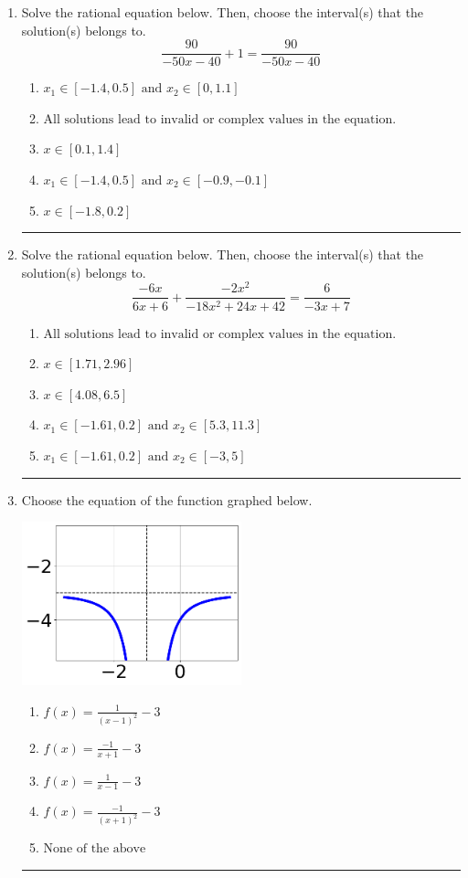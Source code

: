 \documentclass[14pt]{extbook}
\newcommand{\litem}[1]{\item#1\hspace*{-1cm}\rule{\textwidth}{0.4pt}}
\begin{document}
\begin{enumerate}
{\begin{enumerate}[label=\Alph*.]
\end{enumerate} }
\litem{
Solve the rational equation below. Then, choose the interval(s) that the solution(s) belongs to.\[ \frac{90}{-50x -40} + 1 = \frac{90}{-50x -40} \]\begin{enumerate}[label=\Alph*.]
\item \( x_1 \in [-1.4, 0.5] \text{ and } x_2 \in [0,1.1] \)
\item \( \text{All solutions lead to invalid or complex values in the equation.} \)
\item \( x \in [0.1,1.4] \)
\item \( x_1 \in [-1.4, 0.5] \text{ and } x_2 \in [-0.9,-0.1] \)
\item \( x \in [-1.8,0.2] \)

\end{enumerate} }
\litem{
Solve the rational equation below. Then, choose the interval(s) that the solution(s) belongs to.\[ \frac{-6x}{6x + 6} + \frac{-2x^{2}}{-18x^{2} +24 x + 42} = \frac{6}{-3x + 7} \]\begin{enumerate}[label=\Alph*.]
\item \( \text{All solutions lead to invalid or complex values in the equation.} \)
\item \( x \in [1.71,2.96] \)
\item \( x \in [4.08,6.5] \)
\item \( x_1 \in [-1.61, 0.2] \text{ and } x_2 \in [5.3,11.3] \)
\item \( x_1 \in [-1.61, 0.2] \text{ and } x_2 \in [-3,5] \)

\end{enumerate} }
\litem{
Choose the equation of the function graphed below.
\begin{center}
    \includegraphics[width=0.5\textwidth]{../Figures/rationalGraphToEquationB.png}
\end{center}
\begin{enumerate}[label=\Alph*.]
\item \( f(x) = \frac{1}{(x - 1)^2} - 3 \)
\item \( f(x) = \frac{-1}{x + 1} - 3 \)
\item \( f(x) = \frac{1}{x - 1} - 3 \)
\item \( f(x) = \frac{-1}{(x + 1)^2} - 3 \)
\item \( \text{None of the above} \)

\end{enumerate} }
\end{enumerate}
\end{document}
